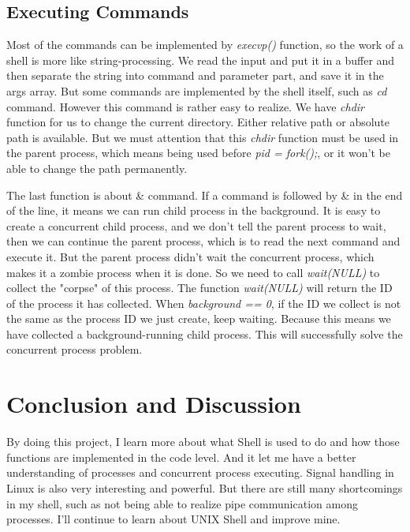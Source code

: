 \documentclass[a4paper, 11pt]{article}
\begin{document}
\subsection{Executing Commands}
Most of the commands can be implemented by \emph{execvp()} function, so the work of a shell is more like string-processing. We read the input and put it in a buffer and then separate the string into command and parameter part, and save it in the args array. But some commands are implemented by the shell itself, such as \emph{cd} command. However this command is rather easy to realize. We have \emph{chdir} function for us to change the current directory. Either relative path or absolute path is available. But we must attention that this \emph{chdir} function must be used in the parent process, which means being used before \emph{pid = fork();}, or it won't be able to change the path permanently.

The last function is about \& command. If a command is followed by \& in the end of the line, it means we can run child process in the background. It is easy to create a concurrent child process, and we don't tell the parent process to wait, then we can continue the parent process, which is to read the next command and execute it. But the parent process didn't wait the concurrent process, which makes it a zombie process when it is done. So we need to call \emph{wait(NULL)} to collect the "corpse" of this process. The function \emph{wait(NULL)} will return the ID of the process it has collected. When \emph{background == 0}, if the ID we collect is not the same as the process ID we just create, keep waiting. Because this means we have collected a background-running child process. This will successfully solve the concurrent process problem.
\section{Conclusion and Discussion}
By doing this project, I learn more about what Shell is used to do and how those functions are implemented in the code level. And it let me have a better understanding of processes and concurrent process executing. Signal handling in Linux is also very interesting and powerful. But there are still many shortcomings in my shell, such as not being able to realize pipe communication among processes. I'll continue to learn about UNIX Shell and improve mine.
\end{document}
